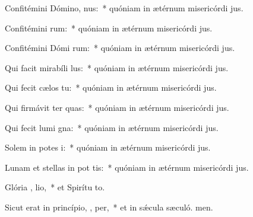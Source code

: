 \item Confitémini Dómino,  nus:~* quóniam in ætérnum misericórdi jus.
\item Confitémini  rum:~* quóniam in ætérnum misericórdi jus.
\item Confitémini Dómi rum:~* quóniam in ætérnum misericórdi jus.
\item Qui facit mirabíli  lus:~* quóniam in ætérnum misericórdi jus.
\item Qui fecit cælos  tu:~* quóniam in ætérnum misericórdi jus.
\item Qui firmávit ter  quas:~* quóniam in ætérnum misericórdi jus.
\item Qui fecit lumi gna:~* quóniam in ætérnum misericórdi jus.
\item Solem in potes i:~* quóniam in ætérnum misericórdi jus.
\item Lunam et stellas in pot tis:~* quóniam in ætérnum misericórdi jus.
\item Glória ,  lio,~* et Spirítu to.
\item Sicut erat in princípio,  ,  per,~* et in sǽcula sæculó. men.
